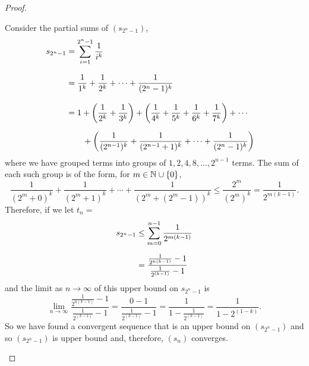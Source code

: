 \documentclass[../MathsNotesBase.tex]{subfiles}
\begin{document}
{\begin{proof}
\begin{enumerate}[label=(\roman*)]
				 Consider the partial sums of $(s_{2^n - 1})$,
				 \[\begin{aligned}
				 	s_{2^n - 1} &= \sum_{i=1}^{2^n - 1} \frac{1}{i^k} \nnn
				 	&= \frac{1}{1^k} + \frac{1}{2^k} + \cdots + \frac{1}{(2^n - 1)^k} &\sidecomment{} \nnn
				 	&= 1 + \left(\frac{1}{2^k} + \frac{1}{3^k}\right) + \left(\frac{1}{4^k} + \frac{1}{5^k} + \frac{1}{6^k} + \frac{1}{7^k}\right) + \cdots \nn
				 	&\hspace{20pt} + \left(\frac{1}{(2^{n-1})^k} + \frac{1}{(2^{n-1} + 1)^k} + \cdots + \frac{1}{(2^n - 1)^k}\right) &\sidecomment{} \\
				 \end{aligned}\]
			 	 where we have grouped terms into groups of $1, 2, 4, 8, \dots, 2^{n-1}$ terms. The sum of each such group is of the form, for ${ m \in \mathbb{N}^{} \cup \{0\} }$,
			 	 \[ \frac{1}{(2^m + 0)^k} + \frac{1}{(2^m + 1)^k} + \cdots + \frac{1}{(2^m + (2^m - 1))^k} \leq \frac{2^m}{(2^m)^k} = \frac{1}{2^{m(k-1)}}. \]
			 	 Therefore, if we let ${ t_n =  }$
			 	 \[\begin{aligned}
			 	 	s_{2^n - 1} &\leq \sum_{m=0}^{n-1} \frac{1}{2^{m(k-1)}} \nn
			 	 	&= \frac{\frac{1}{2^{n(k-1)}} - 1}{\frac{1}{2^{(k-1)}} - 1}
			 	 \end{aligned}\]
		 	 	\nl
		 	 	and the limit as ${ n \to \infty }$ of this upper bound on $s_{2^n - 1}$ is
		 	 	\[ \lim_{n \to \infty} \frac{\frac{1}{2^{n(k-1)}} - 1}{\frac{1}{2^{(k-1)}} - 1} = \frac{0 - 1}{\frac{1}{2^{(k-1)}} - 1} = \frac{1}{1 - \frac{1}{2^{(k-1)}}} = \frac{1}{1 - 2^{(1-k)}}. \]
		 	 	So we have found a convergent sequence that is an upper bound on $(s_{2^n - 1})$ and so $(s_{2^n - 1})$ is upper bound and, therefore, $(s_n)$ converges.
			\end{enumerate}
		\end{proof}
	
		
		
}
\end{document}
